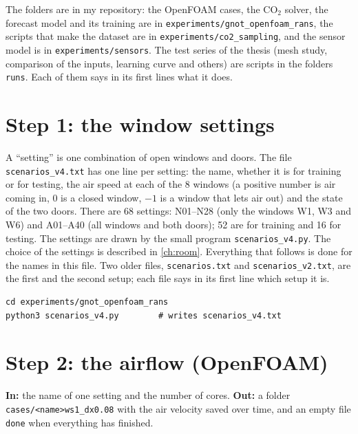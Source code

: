 \noindent The folders are in my repository: the OpenFOAM cases, the CO$_2$ solver, the forecast model and its training are in
\texttt{experiments/\allowbreak gnot\_\allowbreak openfoam\_\allowbreak rans}, the scripts that make the dataset are in
\texttt{experiments/\allowbreak co2\_\allowbreak sampling}, and the sensor model is in \texttt{experiments/\allowbreak sensors}.
The test series of the thesis (mesh study, comparison of the inputs, learning curve and others) are scripts in the
folders \texttt{runs}. Each of them says in its first lines what it does.

\section{Step 1: the window settings}
A ``setting'' is one combination of open windows and doors. The file \texttt{scenarios\_v4.txt} has one line per setting:
the name, whether it is for training or for testing, the air speed at each of the 8 windows (a positive number is air
coming in, 0 is a closed window, $-1$ is a window that lets air out) and the state of the two doors. There are 68 settings:
N01--N28 (only the windows W1, W3 and W6) and A01--A40 (all windows and both doors); 52 are for training and 16 for testing.
The settings are drawn by the small program \texttt{scenarios\_v4.py}. The choice of the settings is described in \cref{ch:room}. Everything that follows is done for the names in this
file. Two older files, \texttt{scenarios.txt} and \texttt{scenarios\_v2.txt}, are the first and the second setup; each file
says in its first line which setup it is.

\begin{lstlisting}[breaklines=true,postbreak=\space]
cd experiments/gnot_openfoam_rans
python3 scenarios_v4.py        # writes scenarios_v4.txt
\end{lstlisting}


\section{Step 2: the airflow (OpenFOAM)}
\textbf{In:} the name of one setting and the number of cores. \textbf{Out:} a folder \texttt{cases/\allowbreak <name>ws1\_\allowbreak dx0.08} with the
air velocity saved over time, and an empty file \texttt{done} when everything has finished.

